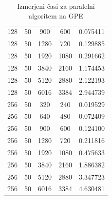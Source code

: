 \documentclass[11pt]{article}
\begin{document}
\begin{table}[H]
\begin{tabular}{c|c|c|c|c}
        128 & 50  & 900     & 600      & 0.075411 \\
        128 & 50  & 1280    & 720      & 0.129885 \\
        128 & 50  & 1920    & 1080     & 0.291662 \\
        128 & 50  & 3840    & 2160     & 1.174453 \\
        128 & 50  & 5120    & 2880     & 2.122193 \\
        128 & 50  & 6016    & 3384     & 2.944739 \\
        256 & 50  & 320     & 240      & 0.019529 \\
        256 & 50  & 640     & 480      & 0.072409 \\
        256 & 50  & 900     & 600      & 0.124100 \\
        256 & 50  & 1280    & 720      & 0.211816 \\
        256 & 50  & 1920    & 1080     & 0.475633 \\
        256 & 50  & 3840    & 2160     & 1.886382 \\
        256 & 50  & 5120    & 2880     & 3.347723 \\
        256 & 50  & 6016    & 3384     & 4.630481 \\
    \end{tabular}
    \caption{Izmerjeni časi za paralelni algoritem na GPE}
\end{table}




\newpage
\printbibliography
\end{document}

